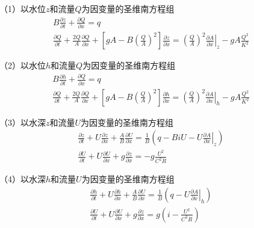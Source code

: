 
（1）以水位$z$和流量$Q$为因变量的圣维南方程组
\begin{equation}
  \begin{gathered}
  B\frac{\partial z}{\partial t}
  +
  \frac{\partial Q}{\partial x}
  =
  q
  \\
  \frac{\partial Q}{\partial t}
  +
  \frac{2Q}{A}\frac{\partial Q}{\partial x}
  +
  \left[
  gA - 
  B
  \left(
    \frac{Q}{A}
  \right)^{2}
  \right]
  \frac{\partial z}{\partial x}
  =
  \left(
    \frac{Q}{A}
  \right)^{2}
  \left.
  \frac{\partial A}{\partial x}
  \right|_{z}
  -
  gA\frac{Q^{2}}{K^{2}}
  \end{gathered}
  \label{EqCGe_SV_zQ}
\end{equation}

（2）以水位$h$和流量$Q$为因变量的圣维南方程组
\begin{equation}
  \begin{gathered}
  B\frac{\partial h}{\partial t}
  +
  \frac{\partial Q}{\partial x}
  =
  q
  \\
  \frac{\partial Q}{\partial t}
  +
  \frac{2Q}{A}\frac{\partial Q}{\partial x}
  +
  \left[
  gA - 
  B
  \left(
    \frac{Q}{A}
  \right)^{2}
  \right]
  \frac{\partial h}{\partial x}
  =
  \left(
    \frac{Q}{A}
  \right)^{2}
  \left.
  \frac{\partial A}{\partial x}
  \right|_{h}
  -
  gA\frac{Q^{2}}{K^{2}}
  \end{gathered}
  \label{EqCGe_SV_hQ}
\end{equation}



（3）以水深$z$和流量$U$为因变量的圣维南方程组
\begin{equation}
  \begin{gathered}
    \frac{\partial z}{\partial t}
    +
    U\frac{\partial z}{\partial x}
    +
    \frac{A}{B}\frac{\partial U}{\partial x}
    =
    \frac{1}{B}
    \left(
      q - BiU - U\left.\frac{\partial A}{\partial x}\right|_{z}
    \right)
  \\
  \frac{\partial U}{\partial t}
  +
  U\frac{\partial U}{\partial x}
  +
  g\frac{\partial z}{\partial x}
  =
  -g\frac{U^{2}}{C^{2}R}
  \end{gathered}
  \label{EqCGe_SV_zU}
\end{equation}

（4）以水深$h$和流量$U$为因变量的圣维南方程组
\begin{equation}
  \begin{gathered}
    \frac{\partial h}{\partial t}
    +
    U\frac{\partial h}{\partial x}
    +
    \frac{A}{B}\frac{\partial U}{\partial x}
    =
    \frac{1}{B}
    \left(
      q - U\left.\frac{\partial A}{\partial x}\right|_{h}
    \right)
  \\
  \frac{\partial U}{\partial t}
  +
  U\frac{\partial U}{\partial x}
  +
  g\frac{\partial z}{\partial x}
  =
  g
  \left(
    i-\frac{U^{2}}{C^{2}R}
    \right)
  \end{gathered}
  \label{EqCGe_SV_hU}
\end{equation}

